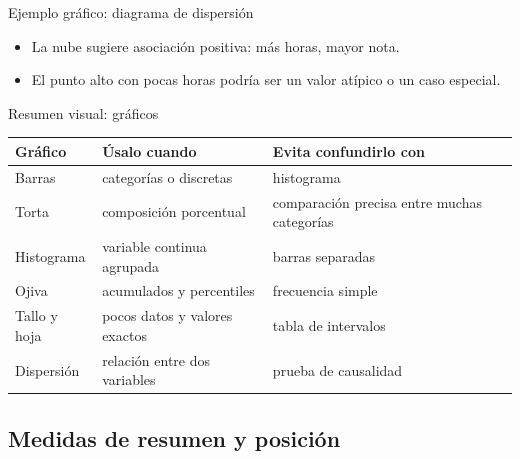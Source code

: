 \documentclass[aspectratio=169,11pt]{beamer}
\begin{document}
\begin{frame}{Ejemplo gráfico: diagrama de dispersión}
\centering
{}
\vspace{0.4em}
\begin{itemize}
  \item La nube sugiere asociación positiva: más horas, mayor nota.
  \item El punto alto con pocas horas podría ser un valor atípico o un caso especial.
\end{itemize}
\end{frame}

\begin{frame}{Resumen visual: gráficos}
\small
\begin{tabular}{p{}p{}p{}}
\toprule
Gráfico & Úsalo cuando & Evita confundirlo con \\
\midrule
Barras & categorías o discretas & histograma \\
Torta & composición porcentual & comparación precisa entre muchas categorías \\
Histograma & variable continua agrupada & barras separadas \\
Ojiva & acumulados y percentiles & frecuencia simple \\
Tallo y hoja & pocos datos y valores exactos & tabla de intervalos \\
Dispersión & relación entre dos variables & prueba de causalidad \\
\bottomrule
\end{tabular}
\end{frame}

\subsection{Medidas de resumen y posición}
\end{document}
